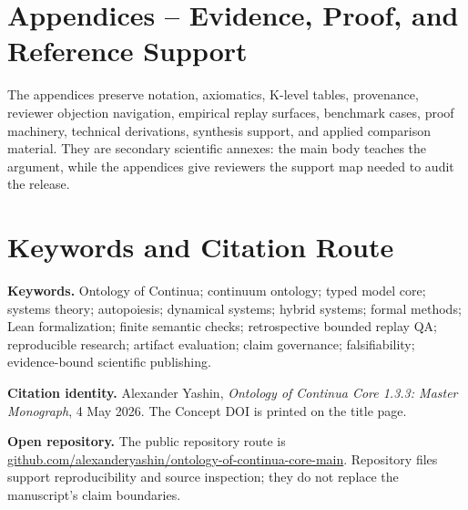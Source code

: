 \documentclass[11pt,a4paper]{article}
\begin{document}
\section*{Appendices -- Evidence, Proof, and Reference Support}
The appendices preserve notation, axiomatics, K-level tables, provenance,
reviewer objection navigation, empirical replay surfaces, benchmark cases,
proof machinery, technical derivations, synthesis support, and applied
comparison material. They are secondary scientific annexes: the main body
teaches the argument, while the appendices give reviewers the support map
needed to audit the release.





















\clearpage
\clearpage
\section*{Keywords and Citation Route}
\noindent\textbf{Keywords.} Ontology of Continua; continuum ontology; typed model core; systems theory; autopoiesis; dynamical systems; hybrid systems; formal methods; Lean formalization; finite semantic checks; retrospective bounded replay QA; reproducible research; artifact evaluation; claim governance; falsifiability; evidence-bound scientific publishing.

\medskip
\noindent\textbf{Citation identity.} Alexander Yashin, \emph{Ontology of Continua Core 1.3.3: Master Monograph}, 4 May 2026. The Concept DOI is printed on the title page.

\medskip
\noindent\textbf{Open repository.} The public repository route is \href{https://github.com/alexanderyashin/ontology-of-continua-core-main}{github.com/alexanderyashin/ontology-of-continua-core-main}. Repository files support reproducibility and source inspection; they do not replace the manuscript's claim boundaries.


\clearpage
\nocite{*}
\printbibliography[heading=bibintoc,title={Bibliography}]
\end{document}
